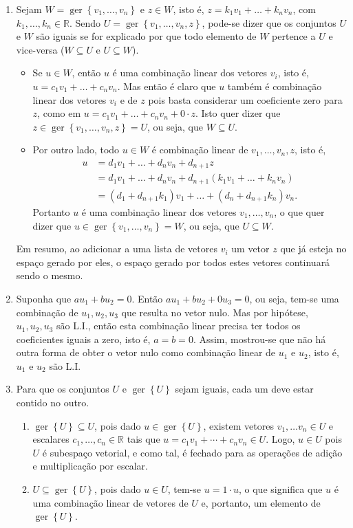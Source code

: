 \documentclass[12pt,a4paper]{article}
\newcommand*\ger[1]{\operatorname{ger}\left\{#1\right\}}
\newcommand*\R{\mathbb{R}}
\begin{document}
\begin{enumerate}
\item Sejam $W = \ger{ v_1, \ldots, v_n }$ e $z \in W$, isto é, $z = k_1 v_1 + \ldots + k_n v_n$, com $k_1, \ldots, k_n \in \R$. Sendo $U = \ger{ v_1, \ldots, v_n, z }$, pode-se dizer que os conjuntos $U$ e $W$ são iguais se for explicado por que todo elemento de $W$ pertence a $U$ e vice-versa ($W \subseteq U$ e $U \subseteq W$).
\begin{itemize}
\item
Se $u \in W$, então $u$ é uma combinação linear dos vetores $v_i$, isto é, $u = c_1 v_1 + \ldots + c_n v_n$. Mas então é claro que $u$ também é combinação linear dos vetores $v_i$ e de $z$ pois basta considerar um coeficiente zero para $z$, como em $u = c_1 v_1 + \ldots + c_n v_n + 0 \cdot z$. Isto quer dizer que $z \in \ger{ v_1, \ldots, v_n, z } = U$, ou seja, que $W \subseteq U$.
\item Por outro lado, todo $u \in W$ é combinação linear de $v_1, \ldots, v_n, z$, isto é,
\begin{align*}
u
& = d_1 v_1 + \ldots + d_n v_n + d_{n+1} z \\
& = d_1 v_1 + \ldots + d_n v_n + d_{n+1}(k_1 v_1 + \ldots + k_n v_n) \\
& = (d_1 + d_{n+1}k_1) v_1 + \ldots + ( d_n + d_{n+1}k_n) v_n.
\end{align*}
Portanto $u$ é uma combinação linear dos vetores $v_1, \ldots, v_n$, o que quer dizer que $u \in \ger{ v_1, \ldots, v_n } = W$, ou seja, que $U \subseteq W$.
\end{itemize}
Em resumo, ao adicionar a uma lista de vetores $v_i$ um vetor $z$ que já esteja no espaço gerado por eles, o espaço gerado por todos estes vetores continuará sendo o mesmo.

\item Suponha que $a u_1 + bu_2 = 0$. Então $a u_1 + b u_2 + 0 u_3= 0$, ou seja, tem-se uma combinação de $u_1, u_2, u_3$ que resulta no vetor nulo. Mas por hipótese, $u_1, u_2, u_3$ são L.I., então esta combinação linear precisa ter todos os coeficientes iguais a zero, isto é, $a=b=0$. Assim, mostrou-se que não há outra forma de obter o vetor nulo como combinação linear de $u_1$ e $u_2$, isto é, $u_1$ e $u_2$ são L.I.

\item Para que os conjuntos $U$ e $\ger{U}$ sejam iguais, cada um deve estar contido no outro.
\begin{enumerate}
\item $\ger{U} \subseteq U$, pois dado $u \in \ger{U}$, existem vetores $v_1, \ldots v_n \in U$ e escalares $c_1, \ldots, c_n \in \R$ tais que $u = c_1v_1 + \cdots + c_nv_n \in U$. Logo, $u \in U$ pois $U$ é subespaço vetorial, e como tal, é fechado para as operações de adição e multiplicação por escalar.
\item $U \subseteq \ger{U}$, pois dado $u \in U$, tem-se $u = 1 \cdot u$, o que significa que $u$ é uma combinação linear de vetores de $U$ e, portanto, um elemento de $\ger{U}$.
\end{enumerate}


\end{enumerate}
\end{document}
